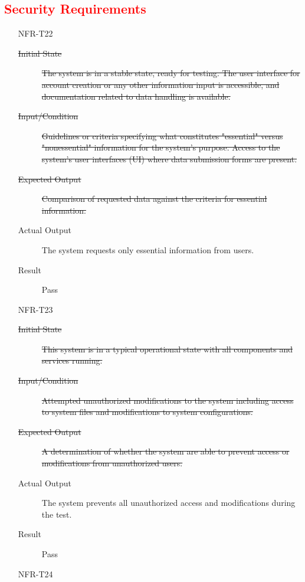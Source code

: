 \documentclass[12pt, titlepage]{article}
\newcommand{\rt}[1]{\textcolor{red}{#1}}
\begin{document}
  \rt{ \subsection{Security Requirements} }
  \begin{enumerate}
    \item[NFR-T22] \label{NFRT22}
      \begin{description}
      \item[\sout{Initial State}] \sout{The system is in a stable state, ready for
          testing. The user interface for account creation or any other
          information input is accessible, and documentation related to data
          handling is available.}
      \item[\sout{Input/Condition}] \sout{Guidelines or criteria specifying what
          constitutes "essential" versus "nonessential" information for the
          system’s purpose. Access to the system's user interfaces (UI) where
          data submission forms are present.}
      \item[\sout{Expected Output}] \sout{Comparison of requested data against the
          criteria for essential information.}
      \item[Actual Output] The system requests only essential information from users.
      \item[Result] Pass
      \end{description}
    \item[NFR-T23] \label{NFRT23}
      \begin{description}
      \item[\sout{Initial State}] \sout{This system is in a typical operational
          state with all components and services running.}
      \item[\sout{Input/Condition}] \sout{Attempted unauthorized modifications to
          the system including access to system files and modifications to
          system configurations.}
      \item[\sout{Expected Output}] \sout{A determination of whether the system are
          able to prevent access or modifications from unauthorized users.}
      \item[Actual Output] The system prevents all unauthorized access and
        modifications during the test.
      \item[Result] Pass
      \end{description}
    \item[NFR-T24] \label{NFRT24}
      \begin{description}

\end{description}
\end{enumerate}
\end{document}
